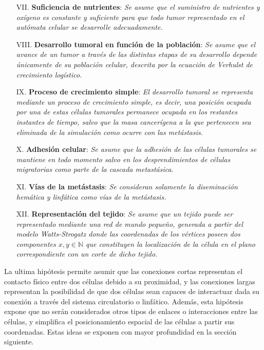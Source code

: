 \begin{enumerate}
\item [{VII.}] \textbf{Suficiencia de nutrientes}: \emph{Se asume que el suministro de nutrientes y ox\'igeno es constante y suficiente para que todo tumor representado en el aut\'omata celular se desarrolle adecuadamente.} \label{VII}

\item [{VIII.}] \textbf{Desarrollo tumoral en funci\'on de la poblaci\'on}: \emph{Se asume que el avance de un tumor a trav\'es de las distintas etapas de su desarrollo depende \'unicamente de su poblaci\'on celular, descrita por la ecuaci\'on de Verhulst de crecimiento log\'istico.} \label{VIII}

\item [{IX.}] \textbf{Proceso de crecimiento simple}: \emph{El desarrollo tumoral se representa mediante un proceso de crecimiento simple, es decir, una posici\'on ocupada por una de estas c\'elulas tumorales permanece ocupada en los restantes instantes de tiempo, salvo que la masa cancer\'igena a la que pertenecen sea eliminada de la simulaci\'on como ocurre con las met\'astasis. } \label{IX}

\item [{X.}] \textbf{Adhesi\'on celular}: \emph{Se asume que la adhesi\'on de las c\'elulas tumorales se mantiene en todo momento salvo en los desprendimientos de c\'elulas migratorias como parte de la cascada metast\'asica.} \label{X}

\item [{XI.}] \textbf{V\'ias de la met\'astasis}: \emph{Se consideran solamente la diseminaci\'on hem\'atica y linf\'atica como v\'ias de la met\'astasis.} \label{XI}

\item [{XII.}] \textbf{Representaci\'on del tejido}: \emph{Se asume que un tejido puede ser representado mediante una red de mundo peque\~no, generada a partir del modelo Watts-Strogatz donde las coordenadas de los v\'ertices poseen dos componentes $x,y \in \mathbb{N}$ que constituyen la localizaci\'on de la c\'elula en el plano correspondiente con un corte de dicho tejido.} \label{XII}
\end{enumerate}

La ultima hip\'otesis permite asumir que las conexiones cortas representan el contacto f\'isico entre dos c\'elulas debido a su proximidad, y las conexiones largas representan la posibilidad de que dos c\'elulas sean capaces de interactuar dada su conexi\'on a trav\'es del sistema circulatorio o linf\'atico. Adem\'as, esta hip\'otesis expone que no ser\'an considerados otros tipos de enlaces o interacciones entre las c\'elulas, y simplifica el posicionamiento espacial de las c\'elulas a partir sus coordenadas. Estas ideas se exponen con mayor profundidad en la secci\'on siguiente.

